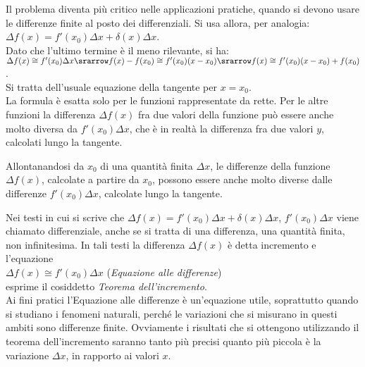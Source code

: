 Il problema diventa più critico nelle applicazioni pratiche, quando si 
devono 
usare le differenze finite al posto dei differenziali. Si usa allora, per
analogia:\\
$\Delta f(x)=f'(x_0)\Delta x + \delta(x)\Delta x$.\\
Dato che l'ultimo termine è il meno rilevante, si ha:\\
$\Delta f(x)\cong f'(x_0)\Delta x \srarrow
f(x)-f(x_0)\cong f'(x_0)(x-x_0)\srarrow f(x)\cong f'(x_0)(x-x_0)+ f(x_0)$.\\
Si tratta dell'usuale equazione della tangente per $x=x_0$.\\
La formula è esatta solo per le funzioni rappresentate da rette.
Per le altre funzioni la differenza $\Delta f(x)$ fra due valori della 
funzione 
può essere anche molto diversa da $f'(x_0)\Delta x$, che è in realtà la 
differenza fra due valori $y$, calcolati lungo la tangente.

\begin{inaccessibleblock}
  \begin{minipage}[]{.4\textwidth}
    \begin{center} \falsodifferenziale \end{center}
 \end{minipage} 
  \hfill
 \begin{minipage}[]{.55\textwidth}
 Allontanandosi da $x_0$ di una quantità finita $\Delta x$, le differenze 
della funzione $\Delta f(x)$, calcolate a partire da $x_0$, possono 
 essere anche molto diverse dalle differenze $f'(x_0)\Delta x$, calcolate 
lungo la tangente.
 \end{minipage}
\end{inaccessibleblock}
\label{}

Nei testi in cui si scrive che $\Delta f(x)=f'(x_0)\Delta x+\delta(x)\Delta 
x$, $f'(x_0)\Delta x$ viene chiamato differenziale, anche se si tratta di una 
differenza, una quantità finita, non infinitesima. In tali testi la differenza
$\Delta f(x)$ è detta incremento e l'equazione\\
$\Delta f(x)\cong f'(x_0)\Delta x$ \hspace{.5cm}(\emph{Equazione alle 
differenze})\\ 
esprime il cosiddetto \emph{Teorema dell'incremento}.\\
Ai fini pratici l'Equazione alle differenze è un'equazione utile, 
soprattutto 
quando si studiano i fenomeni naturali, perché le variazioni che si 
misurano in
questi ambiti sono differenze finite. 
Ovviamente i risultati che si ottengono utilizzando il teorema 
dell'incremento
saranno tanto più precisi quanto più piccola è la variazione $\Delta x$, in 
rapporto ai valori $x$.


